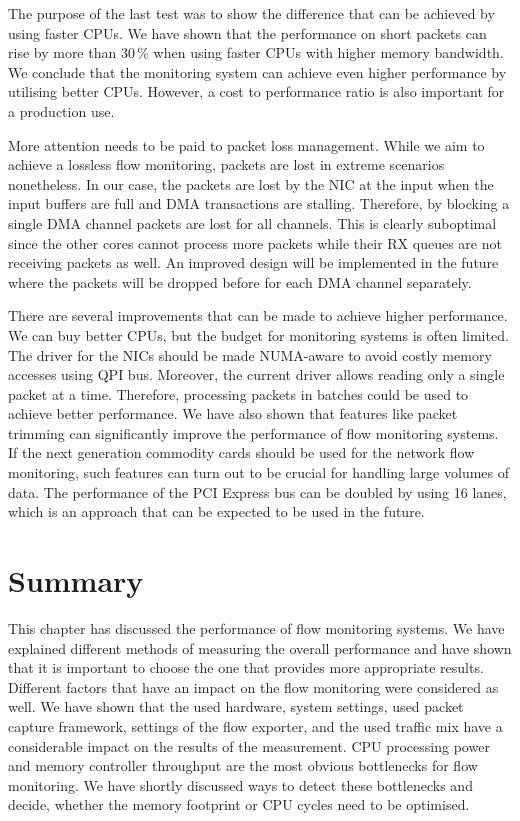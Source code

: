 The purpose of the last test was to show the difference that can be achieved by using faster CPUs. We have shown that the performance on short packets can rise by more than 30\,\% when using faster CPUs with higher memory bandwidth. We conclude that the monitoring system can achieve even higher performance by utilising better CPUs. However, a cost to performance ratio is also important for a production use.

More attention needs to be paid to packet loss management. While we aim to achieve a lossless flow monitoring, packets are lost in extreme scenarios nonetheless. In our case, the packets are lost by the NIC at the input when the input buffers are full and DMA transactions are stalling. Therefore, by blocking a single DMA channel packets are lost for all channels. This is clearly suboptimal since the other cores cannot process more packets while their RX queues are not receiving packets as well. An improved design will be implemented in the future where the packets will be dropped before for each DMA channel separately.

There are several improvements that can be made to achieve higher performance. We can buy better CPUs, but the budget for monitoring systems is often limited. The driver for the NICs should be made NUMA-aware to avoid costly memory accesses using QPI bus. Moreover, the current driver allows reading only a single packet at a time. Therefore, processing packets in batches could be used to achieve better performance. We have also shown that features like packet trimming can significantly improve the performance of flow monitoring systems. If the next generation commodity cards should be used for the network flow monitoring, such features can turn out to be crucial for handling large volumes of data. The performance of the PCI Express bus can be doubled by using 16 lanes, which is an approach that can be expected to be used in the future.

\section{Summary}\label{sec:performance-summary}

This chapter has discussed the performance of flow monitoring systems. We have explained different methods of measuring the overall performance and have shown that it is important to choose the one that provides more appropriate results. Different factors that have an impact on the flow monitoring were considered as well. We have shown that the used hardware, system settings, used packet capture framework, settings of the flow exporter, and the used traffic mix have a considerable impact on the results of the measurement. CPU processing power and memory controller throughput are the most obvious bottlenecks for flow monitoring. We have shortly discussed ways to detect these bottlenecks and decide, whether the memory footprint or CPU cycles need to be optimised.

